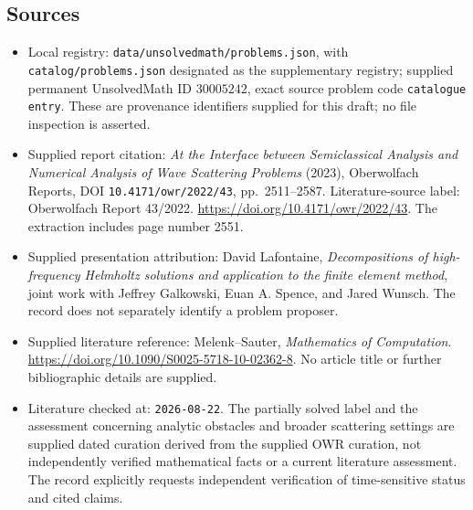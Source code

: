 \documentclass[11pt]{article}
\begin{document}
\subsection{Sources}
\begin{itemize}
\item Local registry: \texttt{data/unsolvedmath/problems.json}, with \texttt{catalog/problems.json} designated as the supplementary registry; supplied permanent UnsolvedMath ID \(30005242\), exact source problem code \texttt{catalogue entry}. These are provenance identifiers supplied for this draft; no file inspection is asserted.
\item Supplied report citation: \emph{At the Interface between Semiclassical Analysis and Numerical Analysis of Wave Scattering Problems} (2023), Oberwolfach Reports, DOI \texttt{10.4171/owr/2022/43}, pp.\ 2511--2587. Literature-source label: Oberwolfach Report 43/2022. \url{https://doi.org/10.4171/owr/2022/43}. The extraction includes page number 2551.
\item Supplied presentation attribution: David Lafontaine, \emph{Decompositions of high-frequency Helmholtz solutions and application to the finite element method}, joint work with Jeffrey Galkowski, Euan A. Spence, and Jared Wunsch. The record does not separately identify a problem proposer.
\item Supplied literature reference: Melenk--Sauter, \emph{Mathematics of Computation}. \url{https://doi.org/10.1090/S0025-5718-10-02362-8}. No article title or further bibliographic details are supplied.
\item Literature checked at: \texttt{2026-08-22}. The partially solved label and the assessment concerning analytic obstacles and broader scattering settings are supplied dated curation derived from the supplied OWR curation, not independently verified mathematical facts or a current literature assessment. The record explicitly requests independent verification of time-sensitive status and cited claims.
\end{itemize}
\end{document}
